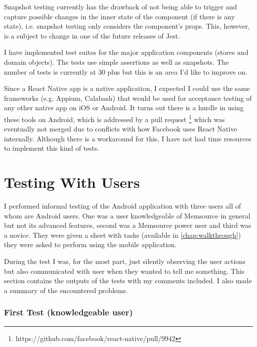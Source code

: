 Snapshot testing currently has the drawback of not being able to trigger and capture possible changes in the inner state of the component (if there is any state), i.e. snapshot testing only considers the component’s props. This, however, is a subject to change in one of the future releases of Jest.


I have implemented test suites for the major application components (stores and domain objects). The tests use simple assertions as well as snapshots. The number of tests is currently at 30 plus but this is an area I'd like to improve on.


Since a React Native app is a native application, I expected I could use the same frameworks (e.g. Appium, Calabash) that would be used for acceptance testing of any other native app on iOS or Android. It turns out there is a hurdle in using these tools on Android, which is addressed by a pull request \footnote{https://github.com/facebook/react-native/pull/9942} which was eventually not merged due to conflicts with how Facebook uses React Native internally. Although there is a workaround for this, I have not had time resources to implement this kind of tests.



\section{Testing With Users}

I performed informal testing of the Android application with three users all of whom are Android users. One was a user knowledgeable of Memsource in general but not its advanced features, second was a Memsource power user and third was a novice. They were given a sheet with tasks (available in \autoref{chap:walkthrough}) they were asked to perform using the mobile application.

During the test I was, for the most part, just silently observing the user actions but also communicated with user when they wanted to tell me something. This section contains the outputs of the tests with my comments included. I also made a summary of the encountered problems.


\subsubsection{First Test (knowledgeable user)}

